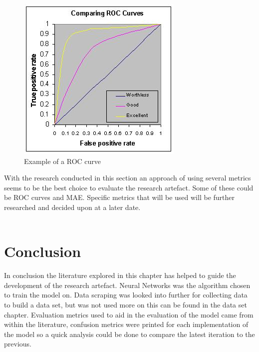 \begin{figure}[h!]
  \centering
  \includegraphics[width = (\textwidth)/2]{roccomp.jpg}
  \caption{Example of a ROC curve}
  \label{fig:ROC}
\end{figure}


With the research conducted in this section an approach of using several metrics seems to be the best choice to evaluate the research artefact. Some of these could be ROC curves and MAE. Specific metrics that will be used will be further researched and decided upon at a later date.\\ \\


\section{Conclusion}
In conclusion the literature explored in this chapter has helped to guide the development of the research artefact. Neural Networks was the algorithm chosen to train the model on. Data scraping was looked into further for collecting data to build a data set, but was not used more on this can be found in the data set chapter. Evaluation metrics used to aid in the evaluation of the model came from within the literature, confusion metrics were printed for each implementation of the model so a quick analysis could be done to compare the latest iteration to the previous. 